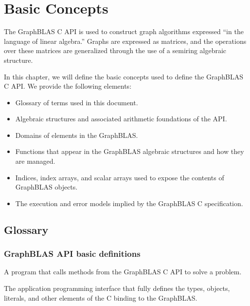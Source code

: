 \chapter{Basic Concepts}
\label{Chp:Concepts}

The GraphBLAS C API is used to construct  
graph algorithms expressed ``in the language of linear algebra.''
Graphs are expressed as matrices, and the operations over 
these matrices are generalized through the use of a
semiring algebraic structure.

In this chapter, we will define the basic concepts used to
define the GraphBLAS C API.  We provide the following elements:
\begin{itemize}
\item Glossary of terms used in this document.  

\item Algebraic structures and associated arithmetic foundations of the API.

\item Domains of  elements in the GraphBLAS.  

\item Functions that appear in the GraphBLAS algebraic 
structures and how they are managed.

\item Indices, index arrays, and scalar arrays used
to expose the contents of GraphBLAS objects.  

\item The execution and error models implied by the GraphBLAS C specification.

\end{itemize}

\section{Glossary}

\subsection{GraphBLAS API basic definitions}

\glossBegin

 A program that calls methods from the GraphBLAS C API to
solve a problem.

 The application programming interface that fully defines the types, objects, 
literals, and other elements of the C binding to the GraphBLAS.

